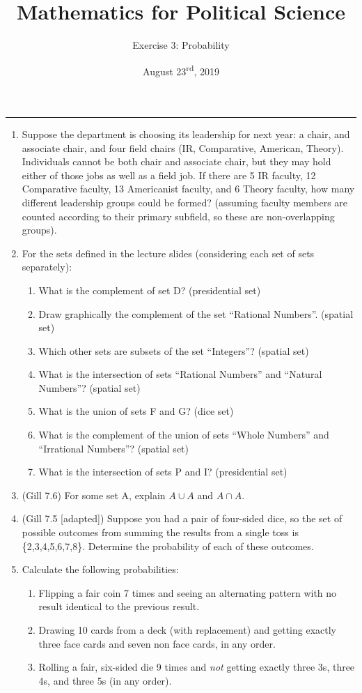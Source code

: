 \documentclass[11pt]{article}
\title{\Large{\bf{\vspace{-100pt}Mathematics for Political Science \vspace{-15pt}}}}
\author{\large{Exercise 3: Probability}}
\date{August 23\textsuperscript{rd}, 2019}
\begin{document}
\maketitle

\hrule

\begin{enumerate}

\item Suppose the department is choosing its leadership for next year: a chair, and associate chair, and four field chairs (IR, Comparative, American, Theory).  Individuals cannot be both chair and associate chair, but they may hold either of those jobs as well as a field job.  If there are 5 IR faculty, 12 Comparative faculty, 13 Americanist faculty, and 6 Theory faculty, how many different leadership groups could be formed? (assuming faculty members are counted according to their primary subfield, so these are non-overlapping groups).


\item For the sets defined in the lecture slides (considering each set of sets separately):
\begin{enumerate}
\item What is the complement of set D? (presidential set)
\item Draw graphically the complement of the set ``Rational Numbers''. (spatial set)
\item Which other sets are subsets of the set ``Integers''? (spatial set)
\item What is the intersection of sets ``Rational Numbers'' and ``Natural Numbers''? (spatial set)
\item What is the union of sets F and G? (dice set)
\item What is the complement of the union of sets ``Whole Numbers'' and ``Irrational Numbers''? (spatial set)
\item What is the intersection of sets P and I? (presidential set)
\end{enumerate}


\item (Gill 7.6) For some set A, explain $A \cup A$ and $A \cap A$.


\item (Gill 7.5 [adapted]) Suppose you had a pair of four-sided dice, so the set of possible outcomes from summing the results from a single toss is \{2,3,4,5,6,7,8\}.  Determine the probability of each of these outcomes.


\item Calculate the following probabilities:
\begin{enumerate}
\item Flipping a fair coin 7 times and seeing an alternating pattern with no result identical to the previous result. 
\item Drawing 10 cards from a deck (with replacement) and getting exactly three face cards and seven non face cards, in any order.
\item Rolling a fair, six-sided die 9 times and \textit{not} getting exactly three 3s, three 4s, and three 5s (in any order).
\end{enumerate}



\end{enumerate}
\end{document}
